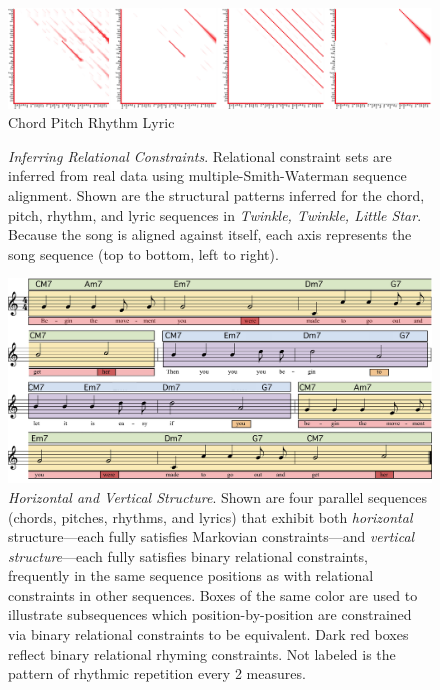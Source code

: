 \documentclass[phd,electronic,oneside,twosidetoc,letterpaper,chaptercenter,parttop,lof,lot]{byumsphd}
\begin{document}
\begin{figure}
    \centering
    \includegraphics[width=\linewidth]{structure}
     Chord \hspace{100pt} Pitch \hspace{100pt} Rhythm \hspace{100pt} Lyric
    \caption{\textit{Inferring Relational Constraints}. Relational constraint sets are inferred from real data using multiple-Smith-Waterman sequence alignment. Shown are the structural patterns inferred for the chord, pitch, rhythm, and lyric sequences in \emph{Twinkle, Twinkle, Little Star}. Because the song is aligned against itself, each axis represents the song sequence (top to bottom, left to right).}
    \label{fig:structurex}
\end{figure}

\begin{figure}
    \centering
    \includegraphics[width=.8\linewidth]{Song}
    \caption{\textit{Horizontal and Vertical Structure}. Shown are four parallel sequences (chords, pitches, rhythms, and lyrics) that exhibit both \emph{horizontal} structure---each fully satisfies Markovian constraints---and \emph{vertical structure}---each fully satisfies binary relational constraints, frequently in the same sequence positions as with relational constraints in other sequences. Boxes of the same color are used to illustrate subsequences which position-by-position are constrained via binary relational constraints to be equivalent. Dark red boxes reflect binary relational rhyming constraints. Not labeled is the pattern of rhythmic repetition every 2 measures.}
    \label{fig:song}
\end{figure}
\end{document}

